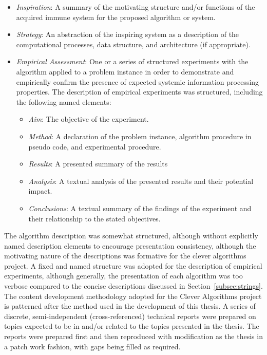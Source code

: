 \documentclass[a4paper, 11pt]{article}
\begin{document}
\begin{itemize}
	\item \emph{Inspiration}: A summary of the motivating structure and/or functions of the acquired immune system for the proposed algorithm or system.
	\item \emph{Strategy}: An abstraction of the inspiring system as a description of the computational processes, data structure, and architecture (if appropriate).
	\item \emph{Empirical Assessment}: One or a series of structured experiments with the algorithm applied to a problem instance in order to demonstrate and empirically confirm the presence of expected systemic information processing properties. The description of empirical experiments was structured, including the following named elements:
	\begin{itemize}
		\item \emph{Aim}: The objective of the experiment.
		\item \emph{Method}: A declaration of the problem instance, algorithm procedure in pseudo code, and experimental procedure.
		\item \emph{Results}: A presented summary of the results
		\item \emph{Analysis}: A textual analysis of the presented results and their potential impact.
		\item \emph{Conclusions}: A textual summary of the findings of the experiment and their relationship to the stated objectives.
	\end{itemize}
\end{itemize}

The algorithm description was somewhat structured, although without explicitly named description elements to encourage presentation consistency, although the motivating nature of the descriptions was formative for the clever algorithms project. A fixed and named structure was adopted for the description of empirical experiments, although generally, the presentation of each algorithm was too verbose compared to the concise descriptions discussed in Section~\ref{subsec:strings}.
The content development methodology adopted for the Clever Algorithms project is patterned after the method used in the development of this thesis. A series of discrete, semi-independent (cross-referenced) technical reports were prepared on topics expected to be in and/or related to the topics presented in the thesis. The reports were prepared first and then reproduced with modification as the thesis in a patch work fashion, with gaps being filled as required. 
\end{document}
